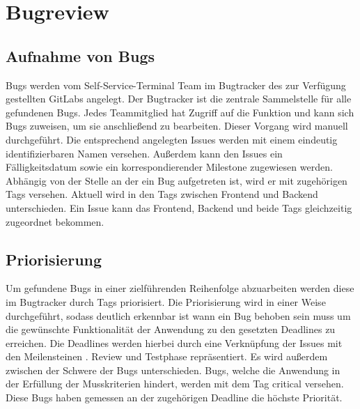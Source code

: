  \section{Bugreview}
 \subsection{Aufnahme von Bugs}
 Bugs werden vom Self-Service-Terminal Team im Bugtracker des zur Verfügung gestellten GitLabs angelegt. Der Bugtracker ist die zentrale Sammelstelle für alle gefundenen Bugs. Jedes Teammitglied hat Zugriff auf die Funktion und kann sich Bugs zuweisen, um sie anschließend zu bearbeiten. Dieser Vorgang wird manuell durchgeführt. Die entsprechend angelegten Issues werden mit einem eindeutig identifizierbaren Namen versehen. Außerdem kann den Issues ein Fälligkeitsdatum sowie ein korrespondierender Milestone zugewiesen werden. Abhängig von der Stelle an der ein Bug aufgetreten ist, wird er mit zugehörigen Tags versehen. Aktuell wird in den Tags zwischen \glqq Frontend\grqq{} und \glqq Backend\grqq{} unterschieden. Ein Issue kann das \glqq Frontend\grqq{}, \glqq Backend\grqq{} und beide Tags gleichzeitig zugeordnet bekommen.
 \vspace{1cm}
 \subsection{Priorisierung}
 Um gefundene Bugs in einer zielführenden Reihenfolge abzuarbeiten werden diese im Bugtracker durch Tags priorisiert. Die Priorisierung wird in einer Weise durchgeführt, sodass deutlich erkennbar ist wann ein Bug behoben sein muss um die gewünschte Funktionalität der Anwendung zu den gesetzten Deadlines zu erreichen. Die Deadlines werden hierbei durch eine Verknüpfung der Issues mit den Meilensteinen . Review\grqq{} und \glqq Testphase\grqq{} repräsentiert. Es wird außerdem zwischen der Schwere der Bugs unterschieden. Bugs, welche die Anwendung in der Erfüllung der Musskriterien hindert, werden mit dem Tag \glqq critical\grqq{} versehen. Diese Bugs haben gemessen an der zugehörigen Deadline die höchste Priorität.
 \newpage
